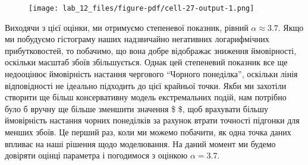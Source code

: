 \documentclass[
  letterpaper,
]{report}
\begin{document}
\begin{figure}[H]

{\centering \texttt{[image: lab\_12\_files/figure-pdf/cell-27-output-1.png]}

}

\end{figure}

Виходячи з цієї оцінки, ми отримуємо степеневої показник, рівний
\(\alpha \approx 3.7\). Якщо ми побудуємо гістограму наших надзвичайно
негативних логарифмічних прибутковостей, то побачимо, що вона добре
відображає зниження ймовірності, оскільки масштаб збоїв збільшується.
Однак цей степеневий показник все ще недооцінює ймовірність настання
чергового ``Чорного понеділка'', оскільки лінія відповідності не
ідеально підходить до цієї крайньої точки. Якби ми захотіли створити ще
більш консервативну модель екстремальних подій, нам потрібно було б
вручну ще більше зменшити значення \$ \alpha \$, щоб врахувати більшу
ймовірність настання чорних понеділків за рахунок втрати точності
підгонки для менших збоїв. Це перший раз, коли ми можемо побачити, як
одна точка даних впливає на наші рішення щодо моделювання. На даний
момент ми будемо довіряти оцінці параметра і погодимося з оцінкою
\(\alpha=3.7\).
\end{document}
